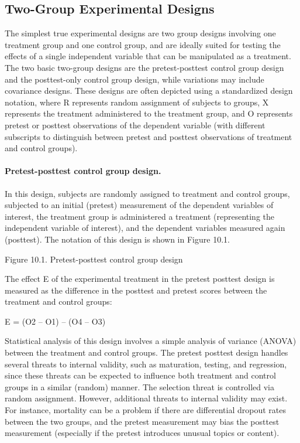 \subsection{Two-Group Experimental Designs}

The simplest true experimental designs are two group designs involving one treatment group and one control group, and are ideally suited for testing the effects of a single independent variable that can be manipulated as a treatment. The two basic two-group designs are the pretest-posttest control group design and the posttest-only control group design, while variations may include covariance designs. These designs are often depicted using a standardized design notation, where R represents random assignment of subjects to groups, X represents the treatment administered to the treatment group, and O represents pretest or posttest observations of the dependent variable (with different subscripts to distinguish between pretest and posttest observations of treatment and control groups).

\paragraph{Pretest-posttest control group design.} In this design, subjects are randomly assigned to treatment and control groups, subjected to an initial (pretest) measurement of the dependent variables of interest, the treatment group is administered a treatment (representing the independent variable of interest), and the dependent variables measured again (posttest). The notation of this design is shown in Figure 10.1.

Figure 10.1. Pretest-posttest control group design

The effect E of the experimental treatment in the pretest posttest design is measured as the difference in the posttest and pretest scores between the treatment and control groups:

E = (O2 – O1) – (O4 – O3)

Statistical analysis of this design involves a simple analysis of variance (ANOVA) between the treatment and control groups. The pretest posttest design handles several threats to internal validity, such as maturation, testing, and regression, since these threats can be expected to influence both treatment and control groups in a similar (random) manner. The selection threat is controlled via random assignment. However, additional threats to internal validity may exist. For instance, mortality can be a problem if there are differential dropout rates between the two groups, and the pretest measurement may bias the posttest measurement (especially if the pretest introduces unusual topics or content).

